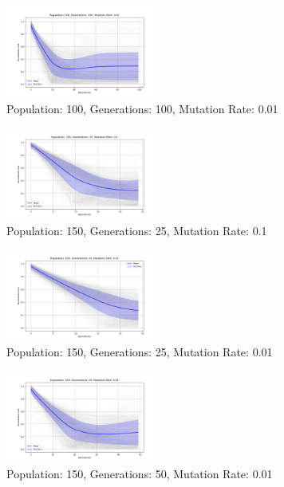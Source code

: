 \documentclass{article}
\begin{document}
    \begin{figure}[H]
        \centering
        \includegraphics[width=0.45\textwidth]{genetic_algorithm/appendix/Population_100_Generations_100_MutationRate_0.01}
        \caption{Population: 100, Generations: 100, Mutation Rate: 0.01}
        \label{fig:app_ga_100_100_01}
    \end{figure}

    \begin{figure}[H]
        \centering
        \includegraphics[width=0.45\textwidth]{genetic_algorithm/appendix/Population_150_Generations_25_MutationRate_0.1}
        \caption{Population: 150, Generations: 25, Mutation Rate: 0.1}
        \label{fig:app_ga_150_25_1}
    \end{figure}

    \begin{figure}[H]
        \centering
        \includegraphics[width=0.45\textwidth]{genetic_algorithm/appendix/Population_150_Generations_25_MutationRate_0.01}
        \caption{Population: 150, Generations: 25, Mutation Rate: 0.01}
        \label{fig:app_ga_150_25_01}
    \end{figure}

    \begin{figure}[H]
        \centering
        \includegraphics[width=0.45\textwidth]{genetic_algorithm/appendix/Population_150_Generations_50_MutationRate_0.01}
        \caption{Population: 150, Generations: 50, Mutation Rate: 0.01}
        \label{fig:app_ga_150_50_01}
    \end{figure}
\end{document}
